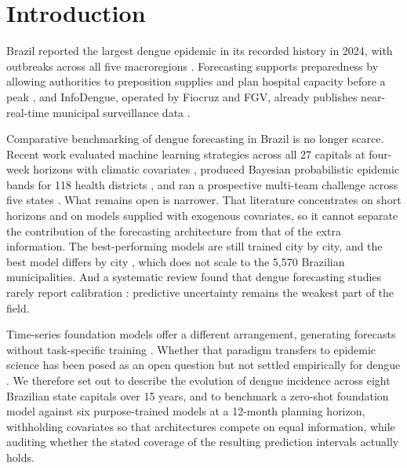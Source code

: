 \documentclass[11pt]{article}
\begin{document}
\section{Introduction}

Brazil reported the largest dengue epidemic in its recorded history in 2024, with
outbreaks across all five macroregions \citep{GurgelGoncalves2024}. Forecasting supports
preparedness by allowing authorities to preposition supplies and plan hospital capacity
before a peak \citep{Roster2022}, and InfoDengue, operated by Fiocruz and FGV, already
publishes near-real-time municipal surveillance data \citep{Codeco2018infodengue}.

Comparative benchmarking of dengue forecasting in Brazil is no longer scarce. Recent work
evaluated machine learning strategies across all 27 capitals at four-week horizons with
climatic covariates \citep{Silva2026capitals}, produced Bayesian probabilistic epidemic
bands for 118 health districts \citep{Freitas2025bands}, and ran a prospective multi-team
challenge across five states \citep{Araujo2026sprint}. What remains open is narrower.
That literature concentrates on short horizons and on models supplied with exogenous
covariates, so it cannot separate the contribution of the forecasting architecture from
that of the extra information. The best-performing models are still trained city by city,
and the best model differs by city \citep{Chen2025rj,Fang2024}, which does not scale to
the 5{,}570 Brazilian municipalities. And a systematic review found that dengue
forecasting studies rarely report calibration \citep{Leung2023}: predictive uncertainty
remains the weakest part of the field.

Time-series foundation models offer a different arrangement, generating forecasts without
task-specific training \citep{Das2024timesfm}. Whether that paradigm transfers to
epidemic science has been posed as an open question but not settled empirically for
dengue \citep{Lau2026foundation}. We therefore set out to describe the evolution of dengue
incidence across eight Brazilian state capitals over 15 years, and to benchmark a
zero-shot foundation model against six purpose-trained models at a 12-month planning
horizon, withholding covariates so that architectures compete on equal information, while
auditing whether the stated coverage of the resulting prediction intervals actually holds.

\end{document}
